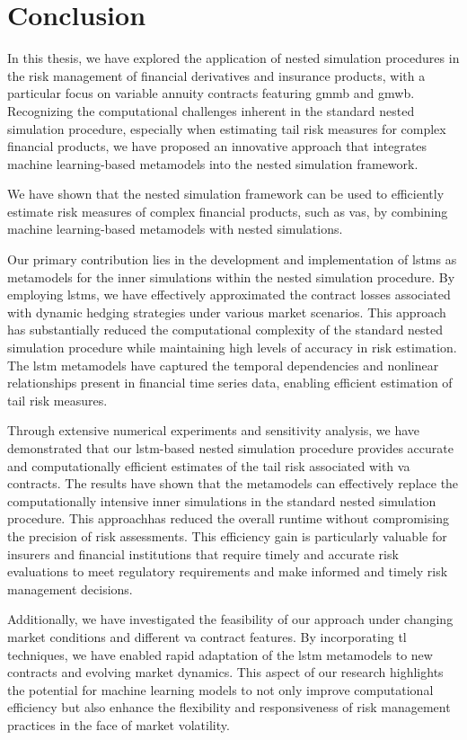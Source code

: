 \chapter{Conclusion} \label{chap:conclusion}

In this thesis, we have explored the application of nested simulation procedures in the risk management of financial derivatives and insurance products, with a particular focus on variable annuity contracts featuring \gls{gmmb} and \gls{gmwb}. 
Recognizing the computational challenges inherent in the standard nested simulation procedure, especially when estimating tail risk measures for complex financial products, we have proposed an innovative approach that integrates machine learning-based metamodels into the nested simulation framework.

We have shown that the nested simulation framework can be used to efficiently estimate risk measures of complex financial products, such as \gls{va}s, by combining machine learning-based metamodels with nested simulations.

Our primary contribution lies in the development and implementation of \gls{lstm}s as metamodels for the inner simulations within the nested simulation procedure. 
By employing \gls{lstm}s, we have effectively approximated the contract losses associated with dynamic hedging strategies under various market scenarios. 
This approach has substantially reduced the computational complexity of the standard nested simulation procedure while maintaining high levels of accuracy in risk estimation. 
The \gls{lstm} metamodels have captured the temporal dependencies and nonlinear relationships present in financial time series data, enabling efficient estimation of tail risk measures.

Through extensive numerical experiments and sensitivity analysis, we have demonstrated that our \gls{lstm}-based nested simulation procedure provides accurate and computationally efficient estimates of the tail risk associated with \gls{va} contracts. 
The results have shown that the metamodels can effectively replace the computationally intensive inner simulations in the standard nested simulation procedure.
This approachhas reduced the overall runtime without compromising the precision of risk assessments.
This efficiency gain is particularly valuable for insurers and financial institutions that require timely and accurate risk evaluations to meet regulatory requirements and make informed and timely risk management decisions.

Additionally, we have investigated the feasibility of our approach under changing market conditions and different \gls{va} contract features. 
By incorporating \gls{tl} techniques, we have enabled rapid adaptation of the \gls{lstm} metamodels to new contracts and evolving market dynamics. 
This aspect of our research highlights the potential for machine learning models to not only improve computational efficiency but also enhance the flexibility and responsiveness of risk management practices in the face of market volatility.

